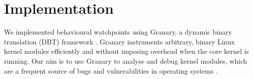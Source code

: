 \documentclass[letterpaper,twocolumn,10pt]{article}
\begin{document}



\section{Implementation}
We implemented behavioural watchpoints using Granary, a dynamic binary translation (DBT) framework \cite{DynamoRIOKernel,GranaryAtOSDI}.  Granary instruments arbitrary, binary Linux kernel modules efficiently and without imposing overhead when the core kernel is running. Our aim is to use Granary to analyse and debug kernel modules, which are a frequent source of bugs and vulnerabilities in operating systems \cite{BGI,LXFI}.
\end{document}
